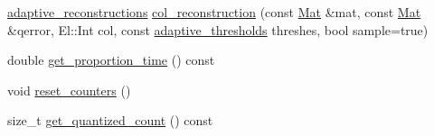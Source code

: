 \begin{DoxyCompactItemize}
\item 
\hyperlink{structlbann_1_1lbann__quantizer_1_1adaptive__reconstructions}{adaptive\+\_\+reconstructions} \hyperlink{classlbann_1_1lbann__quantizer_af77beca5905ff8601ca9b8231a2a16e0}{col\+\_\+reconstruction} (const \hyperlink{base_8hpp_a68f11fdc31b62516cb310831bbe54d73}{Mat} \&mat, const \hyperlink{base_8hpp_a68f11fdc31b62516cb310831bbe54d73}{Mat} \&qerror, El\+::\+Int col, const \hyperlink{structlbann_1_1lbann__quantizer_1_1adaptive__thresholds}{adaptive\+\_\+thresholds} threshes, bool sample=true)
\item 
double \hyperlink{classlbann_1_1lbann__quantizer_a71023cbf93b54d8e8707d137e3c6007a}{get\+\_\+proportion\+\_\+time} () const
\item 
void \hyperlink{classlbann_1_1lbann__quantizer_aee1ea46e3191ad25fd310938eaf5a2e0}{reset\+\_\+counters} ()
\item 
size\+\_\+t \hyperlink{classlbann_1_1lbann__quantizer_afe560823e51a64b1bb42c6f6cbd83ee0}{get\+\_\+quantized\+\_\+count} () const
\end{DoxyCompactItemize}
